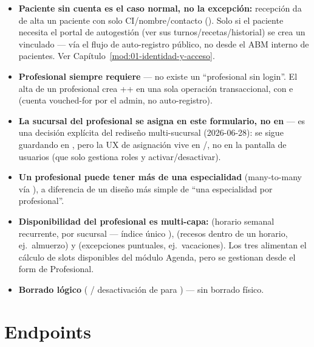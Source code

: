 \begin{itemize}
  \item \textbf{Paciente sin cuenta es el caso normal, no la excepción:} recepción da de alta un paciente con solo CI/nombre/contacto (). Solo si el paciente necesita el portal de autogestión (ver sus turnos/recetas/historial) se crea un  vinculado --- vía el flujo de auto-registro público, no desde el ABM interno de pacientes. Ver Capítulo~\ref{mod:01-identidad-y-acceso}.
  \item \textbf{Profesional siempre requiere } --- no existe un ``profesional sin login''. El alta de un profesional crea ++ en una sola operación transaccional, con \allowbreak {}\allowbreak {} e \allowbreak {}\allowbreak {}\allowbreak {}\allowbreak {} (cuenta vouched-for por el admin, no auto-registro).
  \item \textbf{La sucursal del profesional se asigna en este formulario, no en } --- es una decisión explícita del rediseño multi-sucursal (2026-06-28):  se sigue guardando en , pero la UX de asignación vive en /, no en la pantalla de usuarios (que solo gestiona roles y activar/desactivar).
  \item \textbf{Un profesional puede tener más de una especialidad} (many-to-many vía \allowbreak {}), a diferencia de un diseño más simple de ``una especialidad por profesional''.
  \item \textbf{Disponibilidad del profesional es multi-capa:} \allowbreak {} (horario semanal recurrente, por sucursal --- índice único \allowbreak {}\allowbreak {}\allowbreak {}),  (recesos dentro de un horario, ej.\ almuerzo) y  (excepciones puntuales, ej.\ vacaciones). Los tres alimentan el cálculo de slots disponibles del módulo Agenda, pero se gestionan desde el form de Profesional.
  \item \textbf{Borrado lógico} ( / desactivación de  para ) --- sin borrado físico.
\end{itemize}

\section{Endpoints}
\label{sec:pacientes-endpoints}

